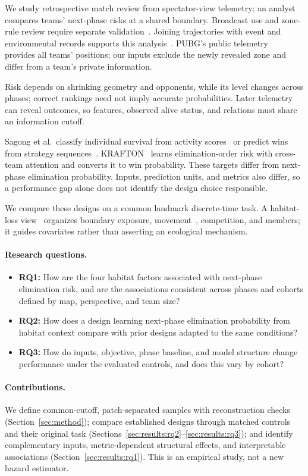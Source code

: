 \documentclass[sigconf,anonymous,nonacm]{acmart}
\begin{document}
We study retrospective match review from spectator-view telemetry: an analyst compares teams' next-phase risks at a shared boundary. Broadcast use and zone-rule review require separate validation~\cite{PUBGBlueZone2026}. Joining trajectories with event and environmental records supports this analysis~\cite{Zheng15}. PUBG's public telemetry~\cite{PUBGAPI} provides all teams' positions; our inputs exclude the newly revealed zone and differ from a team's private information.

Risk depends on shrinking geometry and opponents, while its level changes across phases; correct rankings need not imply accurate probabilities. Later telemetry can reveal outcomes, so features, observed alive status, and relations must share an information cutoff.

Sagong et al.\ classify individual survival from activity scores~\cite{Sagong25a} or predict wins from strategy sequences~\cite{Sagong25b}. KRAFTON~\cite{KRAFTON} learns elimination-order risk with cross-team attention and converts it to win probability. These targets differ from next-phase elimination probability. Inputs, prediction units, and metrics also differ, so a performance gap alone does not identify the design choice responsible.

We compare these designs on a common landmark discrete-time task. A habitat-loss view~\cite{Fahrig03} organizes boundary exposure, movement~\cite{Nathan08}, competition, and members; it guides covariates rather than asserting an ecological mechanism.

\paragraph{Research questions.}
\begin{itemize}
\item \textbf{RQ1:} How are the four habitat factors associated with next-phase elimination risk, and are the associations consistent across phases and cohorts defined by map, perspective, and team size?
\item \textbf{RQ2:} How does a design learning next-phase elimination probability from habitat context compare with prior designs adapted to the same conditions?
\item \textbf{RQ3:} How do inputs, objective, phase baseline, and model structure change performance under the evaluated controls, and does this vary by cohort?
\end{itemize}

\paragraph{Contributions.}
We define common-cutoff, patch-separated samples with reconstruction checks (Section~\ref{sec:method}); compare established designs through matched controls and their original task (Sections~\ref{sec:results:rq2}--\ref{sec:results:rq3}); and identify complementary inputs, metric-dependent structural effects, and interpretable associations (Section~\ref{sec:results:rq1}). This is an empirical study, not a new hazard estimator.
\end{document}
